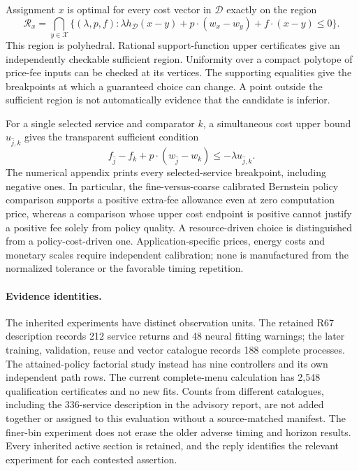 \begin{proposition}\label{prop:prices86}
Assignment $x$ is optimal for every cost vector in $\mathcal D$ exactly on the region
\begin{equation}\label{eq:price-region86}
 \mathcal R_x=\bigcap_{y\in\mathcal X}
 \{(\lambda,p,f):\lambda h_{\mathcal D}(x-y)
              +p\cdot(w_x-w_y)+f\cdot(x-y)\le0\}.
\end{equation}
This region is polyhedral. Rational support-function upper certificates give an independently checkable sufficient region. Uniformity over a compact polytope of price-fee inputs can be checked at its vertices. The supporting equalities give the breakpoints at which a guaranteed choice can change. A point outside the sufficient region is not automatically evidence that the candidate is inferior.
\end{proposition}

For a single selected service and comparator $k$, a simultaneous cost upper bound $u_{\widehat j,k}$ gives the transparent sufficient condition
\[
 f_{\widehat j}-f_k+p\cdot(w_{\widehat j}-w_k)
 \le-\lambda u_{\widehat j,k}.
\]
The numerical appendix prints every selected-service breakpoint, including negative ones. In particular, the fine-versus-coarse calibrated Bernstein policy comparison supports a positive extra-fee allowance even at zero computation price, whereas a comparison whose upper cost endpoint is positive cannot justify a positive fee solely from policy quality. A resource-driven choice is distinguished from a policy-cost-driven one. Application-specific prices, energy costs and monetary scales require independent calibration; none is manufactured from the normalized tolerance or the favorable timing repetition.

\paragraph{Evidence identities.}
The inherited experiments have distinct observation units. The retained R67 description records 212 service returns and 48 neural fitting warnings; the later training, validation, reuse and vector catalogue records 188 complete processes. The attained-policy factorial study instead has nine controllers and its own independent path rows. The current complete-menu calculation has 2,548 qualification certificates and no new fits. Counts from different catalogues, including the 336-service description in the advisory report, are not added together or assigned to this evaluation without a source-matched manifest. The finer-bin experiment does not erase the older adverse timing and horizon results. Every inherited active section is retained, and the reply identifies the relevant experiment for each contested assertion.
